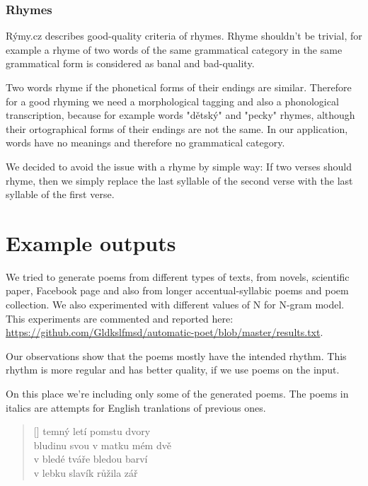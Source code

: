 \documentclass[a4]{article}
\begin{document}
\subsubsection{Rhymes}


Rýmy.cz\cite{rymy} describes good-quality criteria of rhymes. Rhyme
shouldn't be trivial, for example a rhyme of two words of the same
grammatical category in the same grammatical form is considered as banal
and bad-quality.

Two words rhyme if the phonetical forms of their endings are similar. 
Therefore for a good rhyming we need a morphological tagging and
also a phonological transcription, because for example words "dětský" and
"pecky" rhymes, although their ortographical forms of their endings are not
the same. In our application, words have no meanings and
therefore no grammatical category.

We decided to avoid the issue with a rhyme by simple way:
If two verses should rhyme, then we simply replace the last syllable of the
second verse with the last syllable of the first verse.

\section{Example outputs}

We tried to generate poems from different types of texts, from novels,
scientific paper, Facebook page and also from longer accentual-syllabic
poems and poem collection. We also experimented with different values of
N for N-gram model. This experiments are commented and reported here: 
\url{https://github.com/Gldkslfmsd/automatic-poet/blob/master/results.txt}.

Our observations show that the poems mostly have the intended rhythm. This
rhythm is more regular and has better quality, if we use poems on the
input. 

On this place we're including only some of the generated poems. The poems
in italics are attempts for English tranlations of previous ones.




\settowidth{\versewidth}{Than Tycho Brahe, or Erra Pater:}
\begin{verse}[\versewidth]
temný  letí  pomstu  dvory \\
bludinu  svou  v matku  mém  dvě \\
v bledé  tváře  bledou  barví \\
v lebku  slavík  růžila  zář  \\
\end{verse}
\end{document}
